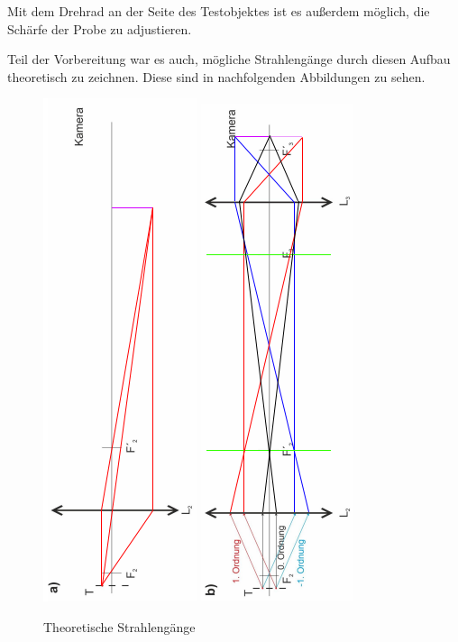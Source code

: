 \documentclass[12pt,a4paper,twoside]{article}
\begin{document}
\noindent
Mit dem Drehrad an der Seite des Testobjektes ist es außerdem möglich, die Schärfe der Probe zu adjustieren. \newline

\noindent
Teil der Vorbereitung war es auch, mögliche Strahlengänge durch diesen Aufbau theoretisch zu zeichnen. Diese sind in nachfolgenden Abbildungen zu sehen.

\begin{figure}[H]
    \centering
    \includegraphics[width=0.3\linewidth, angle=-90]{nudes/Strahlenganga.png}
    \includegraphics[width=0.3\linewidth, angle=-90]{nudes/Strahlengangb.png}
    \caption{Theoretische Strahlengänge}
    \label{fig:SimulationBlau}
\end{figure}
\end{document}
